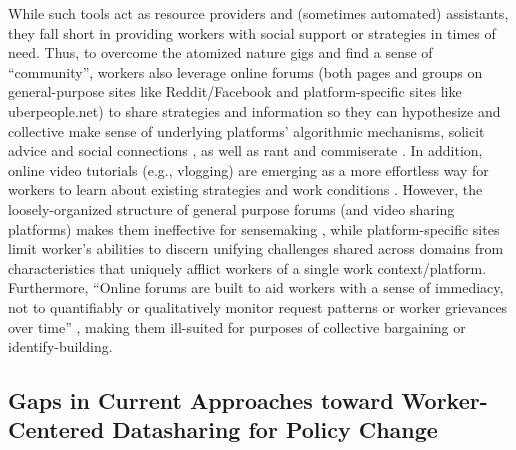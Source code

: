 While such tools act as resource providers and (sometimes automated) assistants, they {fall short in} provid{ing} workers with social support or strategies in times of need. Thus, to overcome {the atomized nature gigs \cite{peersupport, atom}} and find a sense of   ``community'',  workers also leverage online forums (both {pages and groups on general-purpose sites like Reddit/Facebook} and platform-specific sites like uberpeople.net) to share strategies \cite{nomad} and information \cite{machines, peersupport} {so they can hypothesize and collective make sense of underlying platforms' algorithmic mechanisms}, solicit advice and social connections \cite{belonging, organizing}, as well as rant and commiserate \cite{privacy, atom}.  
In addition, online video tutorials (e.g., vlogging) are emerging as a more effortless way for workers to learn about existing strategies and work conditions \cite{chan2019becoming, pires2024delivery, woodside2021bottom}.
However, the loosely-organized structure of general purpose forums (and video sharing platforms) {makes them in}effective for sensemaking \cite{peersupport}, while platform-specific sites limit {worker's abilities to discern unifying challenges shared across domains from characteristics that uniquely afflict workers of a single work context/platform}.
{Furthermore, ``Online forums are built to aid workers with a sense of immediacy, not to quantifiably or qualitatively monitor
request patterns or worker grievances over time'' \cite{organizing}, making them ill-suited for purposes of collective bargaining or identify-building.}


\subsection{Gaps in Current Approaches toward Worker-Centered Datasharing for Policy Change}\label{Related_Work_Using_Data}

